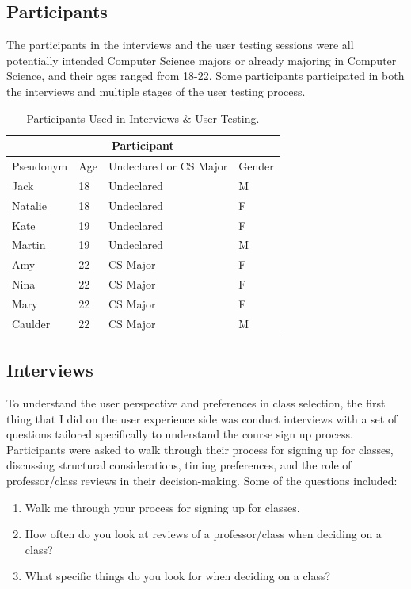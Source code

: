 \documentclass[10pt,twocolumn]{article}
\begin{document}
\subsection{Participants}
The participants in the interviews and the user testing sessions were all potentially intended Computer Science majors or already majoring in Computer Science, and their ages ranged from 18-22. Some participants participated in both the interviews and multiple stages of the user testing process. 

\begin{table}[t]  %
  \centering
  \begin{tabular}{ |p{3cm}||p{3cm}|p{3cm}|p{3cm}|  }
    \hline
    \multicolumn{4}{|c|}{Participant} \\
    \hline
    Pseudonym & Age & Undeclared or CS Major & Gender\\
    \hline
    Jack   &   18  & Undeclared & M\\
    Natalie & 18  & Undeclared & F\\
    Kate & 19 & Undeclared & F\\
    Martin & 19 & Undeclared & M\\
    Amy & 22  & CS Major & F\\
    Nina & 22  & CS Major & F\\
    Mary & 22  & CS Major & F\\
    Caulder & 22  & CS Major & M\\
    \hline
  \end{tabular}
  \caption{Participants Used in Interviews \& User Testing.}
  \label{tab:participant_table}
\end{table}

\subsection{Interviews}

To understand the user perspective and preferences in class selection, the first thing that I did on the user experience side was conduct interviews with a set of questions tailored specifically to understand the course sign up process. Participants were asked to walk through their process for signing up for classes, discussing structural considerations, timing preferences, and the role of professor/class reviews in their decision-making. Some of the questions included:
\begin{enumerate}
\item Walk me through your process for signing up for classes.
\item How often do you look at reviews of a professor/class when deciding on a class?
\item What specific things do you look for when deciding on a class?
\end{enumerate}
\end{document}
